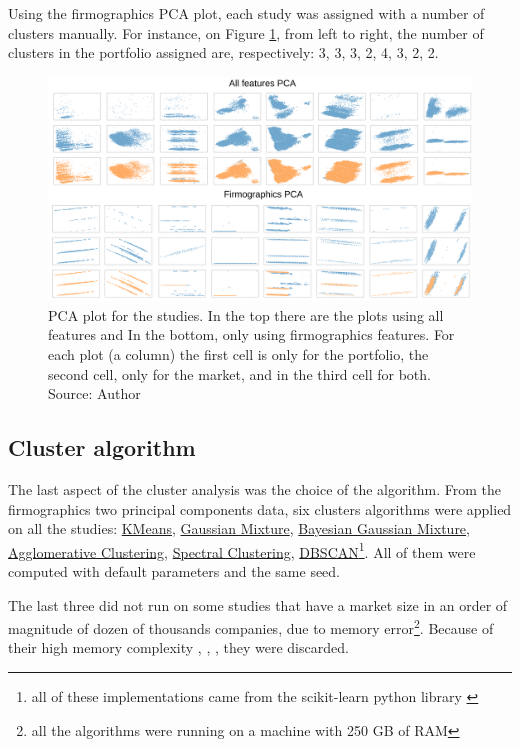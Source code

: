 Using the firmographics PCA plot, each study was assigned with a number of clusters manually. For instance, on Figure \ref{fig:pca-plot}, from left to right, the number of clusters in the portfolio assigned are, respectively: 3, 3, 3, 2, 4, 3, 2, 2.  

\begin{figure}[h]
   \centering
   \includegraphics[width=\linewidth]{fig/ch3-pca-plot.png}
   \caption{PCA plot for the studies. In the top there are the plots using all features and In the bottom, only using firmographics features. For each plot (a column) the first cell is only for the portfolio, the second cell, only for the market, and in the third cell for both. Source: Author}
   \label{fig:pca-plot}
\end{figure}

\subsection{Cluster algorithm}
\label{ch:cluster-algorithm}

The last aspect of the cluster analysis was the choice of the algorithm. From the firmographics two principal components data, six clusters algorithms were applied on all the studies: \underline{KMeans}, \underline{Gaussian Mixture}, \underline{Bayesian Gaussian Mixture}, \underline{Agglomerative Clustering}, \underline{Spectral Clustering}, \underline{DBSCAN}\footnote{all of these implementations came from the scikit-learn python library \cite{scikit-learn}}. All of them were computed with default parameters and the same seed.

The last three did not run on some studies that have a market size in an order of magnitude of dozen of thousands companies, due to memory error\footnote{all the algorithms were running on a machine with 250 GB of RAM}. Because of their high memory complexity \cite{franti2006fast}, \cite{ester1996density}, \cite{yan2009fast}, they were discarded.

